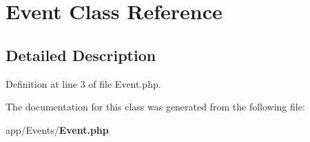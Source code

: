 \section{Event Class Reference}
\label{class_app_1_1_events_1_1_event}


\subsection{Detailed Description}


Definition at line 3 of file Event.\+php.



The documentation for this class was generated from the following file\+:\begin{DoxyCompactItemize}
\item 
app/\+Events/{\bf Event.\+php}\end{DoxyCompactItemize}
